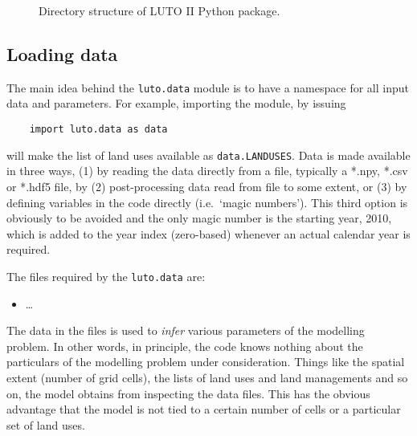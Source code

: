 \documentclass{draft}
\begin{document}
\begin{figure}
\vbox{%
}
\caption{Directory structure of LUTO II Python package.}
\label{fig:package}
\end{figure}

\subsection{Loading data}
The main idea behind the \texttt{luto.data} module is to have a namespace for all input data and parameters. For example, importing the module, by issuing
\begin{verbatim}
	import luto.data as data
\end{verbatim}
will make the list of land uses available as \texttt{data.LANDUSES}. Data is made available in three ways, (1) by reading the data directly from a file, typically a *.npy, *.csv or *.hdf5 file, by (2) post-processing data read from file to some extent, or (3) by defining variables in the code directly (i.e.\ `magic numbers'). This third option is obviously to be avoided and the only magic number is the starting year, 2010, which is added to the year index (zero-based) whenever an actual calendar year is required.

The files required by the \texttt{luto.data} are:
\begin{itemize}
	\item \ldots
\end{itemize}

The data in the files is used to \emph{infer} various parameters of the modelling problem. In other words, in principle, the code knows nothing about the particulars of the modelling problem under consideration. Things like the spatial extent (number of grid cells), the lists of land uses and land managements and so on, the model obtains from inspecting the data files. This has the obvious advantage that the model is not tied to a certain number of cells or a particular set of land uses.
\end{document}

